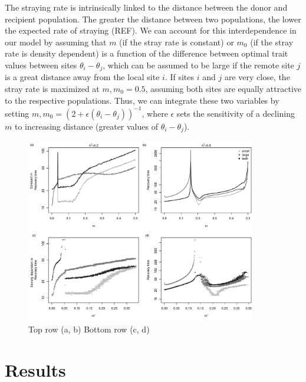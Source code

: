 \documentclass[twocolumn,preprintnumbers,amsmath,amssymb,superscriptaddress]{revtex4}
\begin{document}
The straying rate is intrinsically linked to the distance between the donor and recipient population.
The greater the distance between two populations, the lower the expected rate of straying (REF).
We can account for this interdependence in our model by assuming that $m$ (if the stray rate is constant) or $m_0$ (if the stray rate is density dependent) is a function of the difference between optimal trait values between sites $\theta_i-\theta_j$, which can be assumed to be large if the remote site $j$ is a great distance away from the local site $i$.
If sites $i$ and $j$ are very close, the stray rate is maximized at $m,m_0 = 0.5$, assuming both sites are equally attractive to the respective populations.
Thus, we can integrate these two variables by setting $m,m_0 = (2 + \epsilon (\theta_i-\theta_j))^{-1}$, where $\epsilon$ sets the sensitivity of a declining $m$ to increasing distance (greater values of $\theta_i-\theta_j$).

\begin{figure}
  \captionsetup{justification=raggedright,
singlelinecheck=false
}
\centering
\includegraphics[width=0.9\textwidth]{figs2/fig_relax_comb.pdf}
\caption{
Top row (a, b)
Bottom row (c, d)
} \label{fig:relax}
\end{figure}



\section{Results}
\end{document}
